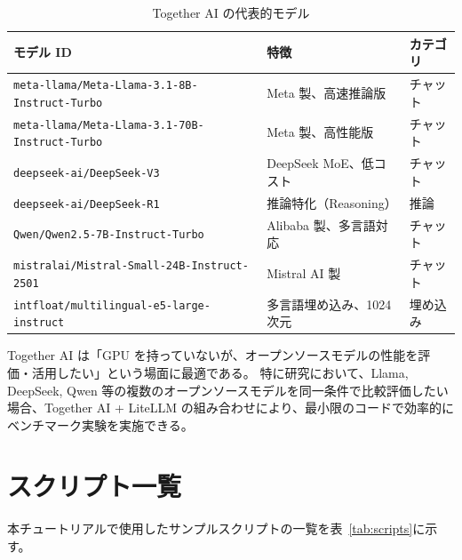 \documentclass[a4paper,11pt]{ltjsarticle}
\newcommand{\code}[1]{\texttt{#1}}
\begin{document}
\begin{table}[htbp]
\centering
\caption{Together AI の代表的モデル}
\label{tab:together_models}
\small
\begin{tabular}{lp{5cm}l}
\toprule
モデル ID & 特徴 & カテゴリ \\
\midrule
\code{meta-llama/Meta-Llama-3.1-8B-Instruct-Turbo}  & Meta 製、高速推論版           & チャット \\
\code{meta-llama/Meta-Llama-3.1-70B-Instruct-Turbo} & Meta 製、高性能版             & チャット \\
\code{deepseek-ai/DeepSeek-V3}                       & DeepSeek MoE、低コスト        & チャット \\
\code{deepseek-ai/DeepSeek-R1}                       & 推論特化（Reasoning）          & 推論 \\
\code{Qwen/Qwen2.5-7B-Instruct-Turbo}               & Alibaba 製、多言語対応         & チャット \\
\code{mistralai/Mistral-Small-24B-Instruct-2501}     & Mistral AI 製                & チャット \\
\code{intfloat/multilingual-e5-large-instruct}       & 多言語埋め込み、1024次元       & 埋め込み \\
\bottomrule
\end{tabular}
\end{table}

\begin{tipbox}[ポイント]
Together AI は「GPU を持っていないが、オープンソースモデルの性能を評価・活用したい」という場面に最適である。
特に研究において、Llama, DeepSeek, Qwen 等の複数のオープンソースモデルを同一条件で比較評価したい場合、Together AI + LiteLLM の組み合わせにより、最小限のコードで効率的にベンチマーク実験を実施できる。
\end{tipbox}


\section{スクリプト一覧}
\label{sec:script_list}

本チュートリアルで使用したサンプルスクリプトの一覧を表~\ref{tab:scripts}に示す。
\end{document}
